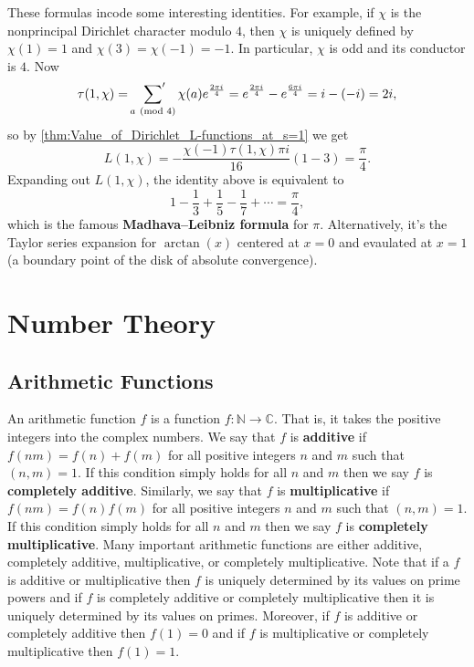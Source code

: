 \documentclass[12pt]{book}
\theoremstyle{definition}\newframedtheorem{method}{Method}
\newcommand{\psum}{\sideset{}{'}\sum}
\newcommand{\tmod}[1]{\ \left(\text{mod }#1\right)}
\newcommand{\N}{\mathbb{N}}
\newcommand{\C}{\mathbb{C}}
\newcommand{\<}{\langle}
\renewcommand{\>}{\rangle}
\begin{document}
      These formulas incode some interesting identities. For example, if $\chi$ is the nonprincipal Dirichlet character modulo $4$, then $\chi$ is uniquely defined by $\chi(1) = 1$ and $\chi(3) = \chi(-1) = -1$. In particular, $\chi$ is odd and its conductor is $4$. Now
      \[
        \tau(1,\chi) = \psum_{a \tmod{4}}\chi(a)e^{\frac{2\pi i}{4}} = e^{\frac{2\pi i}{4}}-e^{\frac{6\pi i}{4}} = i-(-i) = 2i,
      \]
      so by \cref{thm:Value_of_Dirichlet_L-functions_at_s=1} we get
      \[
        L(1,\chi) = -\frac{\chi(-1)\tau(1,\chi)\pi i}{16}(1-3) = \frac{\pi}{4}.
      \]
      Expanding out $L(1,\chi)$, the identity above is equivalent to
      \[
        1-\frac{1}{3}+\frac{1}{5}-\frac{1}{7}+\cdots = \frac{\pi}{4},
      \]
      which is the famous \textbf{Madhava–Leibniz formula} for $\pi$. Alternatively, it's the Taylor series expansion for $\arctan(x)$ centered at $x = 0$ and evaulated at $x = 1$ (a boundary point of the disk of absolute convergence).
\appendix
\chapter{Number Theory}
  \section{Arithmetic Functions}\label{append:Arithmetic_Functions}
    An arithmetic function $f$ is a function $f:\N \to \C$. That is, it takes the positive integers into the complex numbers. We say that $f$ is \textbf{additive} if $f(nm) = f(n)+f(m)$ for all positive integers $n$ and $m$ such that $(n,m) = 1$. If this condition simply holds for all $n$ and $m$ then we say $f$ is \textbf{completely additive}. Similarly, we say that $f$ is \textbf{multiplicative} if $f(nm) = f(n)f(m)$ for all positive integers $n$ and $m$ such that $(n,m) = 1$. If this condition simply holds for all $n$ and $m$ then we say $f$ is \textbf{completely multiplicative}. Many important arithmetic functions are either additive, completely additive, multiplicative, or completely multiplicative. Note that if a $f$ is additive or multiplicative then $f$ is uniquely determined by its values on prime powers and if $f$ is completely additive or completely multiplicative then it is uniquely determined by its values on primes. Moreover, if $f$ is additive or completely additive then $f(1) = 0$ and if $f$ is multiplicative or completely multiplicative then $f(1) = 1$.
\end{document}
